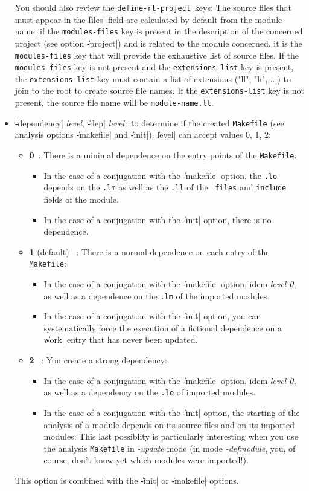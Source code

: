 \begin{itemize}
You should also review the {\tt define-rt-project}\ keys:
The source files that must appear in the \|files| field are calculated by default from the module name:  if the {\tt modules-files} key is present in the description of the concerned project (see option \|-project|) and is related to the module concerned, it is the {\tt modules-files} key that will provide the exhaustive list of source files.  If the {\tt modules-files} key is not present and the {\tt extensions-list} key is present, the {\tt extensions-list} key must contain a list of extensions ("ll", "li", ...) to join to the root to create source file names.
If the {\tt extensions-list} key is not present, the source file name will be {\tt module-name.ll}.

\item {\Large \|-dependency| {\em level}, \|-dep| {\em level}}\,: to determine if the created {\tt Makefile} (see analysis options \|-makefile| and \|-init|).  \|level| can accept values 0, 1, 2:
\begin{itemize}
\item {\Large {\bf 0}}\, :
There is a minimal dependence on the entry points of the {\tt Makefile}:
\begin{itemize}
\item
In the case of a conjugation with the \|-makefile| option, the {\tt .lo}
depends on the {\tt .lm} as well as the {\tt .ll} of the {\tt
files} and {\tt include} fields of the module.
\item
In the case of a conjugation with the \|-init| option, there is no dependence.
\end{itemize}
\item {\Large {\bf 1}} (default) \ :
There is a normal dependence on each entry of the {\tt Makefile}: 
\begin{itemize}
\item
In the case of a conjugation with the \|-makefile| option, 
idem {\em level 0}, as well as a dependence on the 
{\tt .lm} of the imported modules.
\item
In the case of a conjugation with the \|-init| option, you can systematically force the execution of a fictional dependence on a \|work| entry that has never been updated.
\end{itemize}
\item {\Large {\bf 2}} \ :
You create a strong dependency:
\begin{itemize}
\item
In the case of a conjugation with the \|-makefile| option, 
idem {\em level 0}, 
as well as a dependency on the {\tt .lo} of imported modules.
\item
In the case of a conjugation with the \|-init| option, the starting of the analysis of a module depends on its source files and on its imported modules.  This last possiblity is particularly interesting when you use the analysis {\tt Makefile} in {\it -update} mode (in mode {\it -defmodule}, you, of course, don't know yet which modules were imported!).
\end{itemize}
\end{itemize}
This option is combined with the \|-init| or \|-makefile| options.


\end{itemize}
